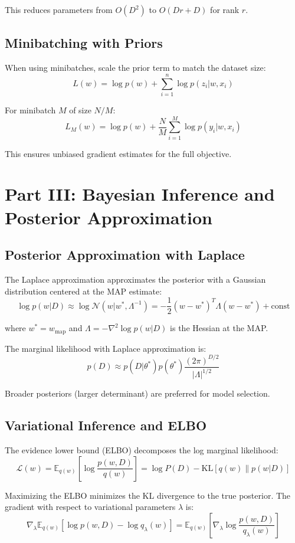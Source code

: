 \documentclass[12pt,a4paper]{article}
\theoremstyle{definition}
\begin{document}
This reduces parameters from $O(D^2)$ to $O(Dr + D)$ for rank $r$.

\subsection{Minibatching with Priors}

When using minibatches, scale the prior term to match the dataset size:
\[
L(w) = \log p(w) + \sum_{i=1}^n \log p(z_i | w, x_i)
\]

For minibatch $M$ of size $N/M$:
\[
L_M(w) = \log p(w) + \frac{N}{M} \sum_{i=1}^M \log p(y_i | w, x_i)
\]

This ensures unbiased gradient estimates for the full objective.

\newpage

\section{Part III: Bayesian Inference and Posterior Approximation}

\subsection{Posterior Approximation with Laplace}

The Laplace approximation approximates the posterior with a Gaussian distribution centered at the MAP estimate:
\[
\log p(w|D) \approx \log \mathcal{N}(w | w^*, \Lambda^{-1}) = -\frac{1}{2}(w - w^*)^T \Lambda (w - w^*) + \text{const}
\]

where $w^* = w_{\text{map}}$ and $\Lambda = -\nabla^2 \log p(w|D)$ is the Hessian at the MAP.

The marginal likelihood with Laplace approximation is:
\[
p(D) \approx p(D|\theta^*) p(\theta^*) \frac{(2\pi)^{D/2}}{|\Lambda|^{1/2}}
\]

Broader posteriors (larger determinant) are preferred for model selection.

\subsection{Variational Inference and ELBO}

The evidence lower bound (ELBO) decomposes the log marginal likelihood:
\[
\mathcal{L}(w) = \mathbb{E}_{q(w)} \left[\log \frac{p(w,D)}{q(w)}\right] = \log P(D) - \mathrm{KL}[q(w) \| p(w|D)]
\]

Maximizing the ELBO minimizes the KL divergence to the true posterior. The gradient with respect to variational parameters $\lambda$ is:
\[
\nabla_\lambda \mathbb{E}_{q(w)} \left[\log p(w, D) - \log q_\lambda(w)\right] = \mathbb{E}_{q(w)} \left[\nabla_\lambda \log \frac{p(w,D)}{q_\lambda(w)}\right]
\]
\end{document}
